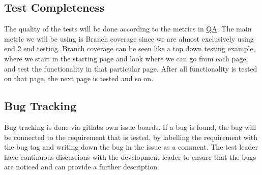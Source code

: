 \subsection{Test Completeness}
The quality of the tests will be done according to the metrics in \href{https://gitlab.liu.se/tddc88-company-3-2020/deploy/-/tree/Document_branch/Quality_Assurance_Plan}{\underline QA}. The main metric we will be using is Branch coverage since we are almost exclusively using end 2 end testing. Branch coverage can be seen like a top down testing example, where we start in the starting page and look where we can go from each page, and test the functionality in that particular page. After all functionality is tested on that page, the next page is tested and so on.

\subsection{Bug Tracking}
Bug tracking is done via gitlabs own issue boards. If a bug is found, the bug will be connected to the requirement that is tested, by labelling the requirement with the bug tag and writing down the bug in the issue as a comment. The test leader have continuous discussions with the development leader to ensure that the bugs are noticed and can provide a further description.

\clearpage